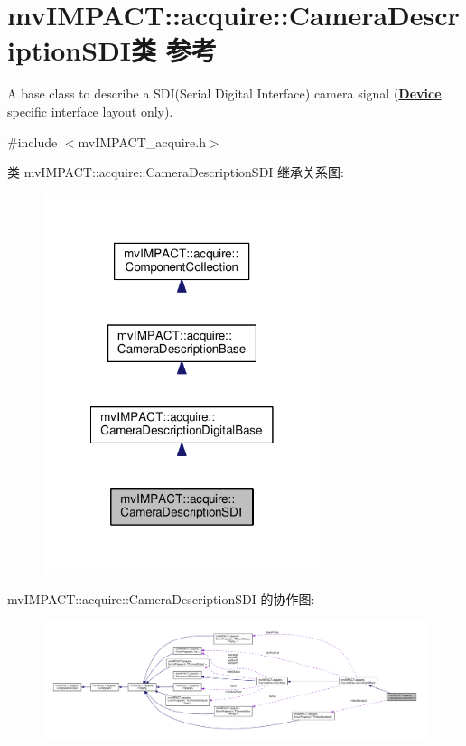 \hypertarget{classmv_i_m_p_a_c_t_1_1acquire_1_1_camera_description_s_d_i}{\section{mv\+I\+M\+P\+A\+C\+T\+:\+:acquire\+:\+:Camera\+Description\+S\+D\+I类 参考}
\label{classmv_i_m_p_a_c_t_1_1acquire_1_1_camera_description_s_d_i}
}


A base class to describe a S\+D\+I(\+Serial Digital Interface) camera signal ({\bfseries \hyperlink{classmv_i_m_p_a_c_t_1_1acquire_1_1_device}{Device}} specific interface layout only).  




{\ttfamily \#include $<$mv\+I\+M\+P\+A\+C\+T\+\_\+acquire.\+h$>$}



类 mv\+I\+M\+P\+A\+C\+T\+:\+:acquire\+:\+:Camera\+Description\+S\+D\+I 继承关系图\+:
\nopagebreak
\begin{figure}[H]
\begin{center}
\leavevmode
\includegraphics[width=230pt]{classmv_i_m_p_a_c_t_1_1acquire_1_1_camera_description_s_d_i__inherit__graph}
\end{center}
\end{figure}


mv\+I\+M\+P\+A\+C\+T\+:\+:acquire\+:\+:Camera\+Description\+S\+D\+I 的协作图\+:
\nopagebreak
\begin{figure}[H]
\begin{center}
\leavevmode
\includegraphics[width=350pt]{classmv_i_m_p_a_c_t_1_1acquire_1_1_camera_description_s_d_i__coll__graph}
\end{center}
\end{figure}
